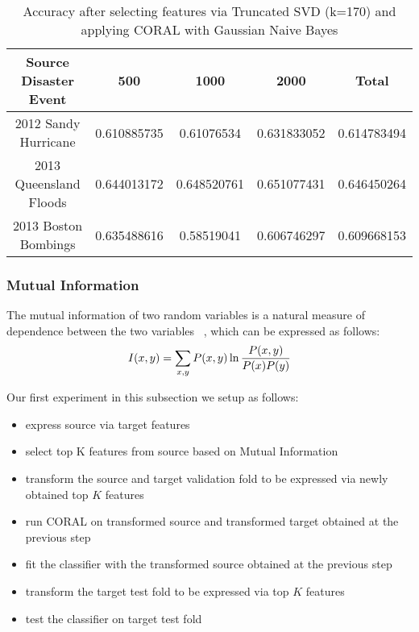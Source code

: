 \begin{table}[!h]%
    \begin{center}
    \caption{Accuracy after selecting features via Truncated SVD (k=170) and applying CORAL with Gaussian Naive Bayes}
    \begin{tabular}[c]{|c|c|c|c|c|}
        \hline
        Source Disaster Event & 500 & 1000 & 2000 & Total \\
        \hline
        2012 Sandy Hurricane & 0.610885735 & 0.61076534 & 0.631833052 & 0.614783494 \\
        2013 Queensland Floods & 0.644013172 & 0.648520761 & 0.651077431 & 0.646450264 \\
        2013 Boston Bombings & 0.635488616 & 0.58519041 & 0.606746297 & 0.609668153 \\
        \hline
    \end{tabular}
    \label{tabletrunsvd170}
   \end{center}
\end{table}


\subsubsection{Mutual Information}

The mutual information of two random variables is a natural measure of dependence between the two variables ~\citep{hastie}, which can be expressed as follows: \[I(x,y) = \sum_{x,y} P(x,y) \ln {{P(x,y)}\over{P(x) P(y)}} \]

Our first experiment in this subsection we setup as follows:
  \begin{itemize}
  \item express source via target features
  \item select top K features from source based on Mutual Information
  \item transform the source and target validation fold to be expressed via newly obtained top $K$ features 
  \item run CORAL on transformed source and transformed target obtained at the previous step
  \item fit the classifier with the transformed source obtained at the previous step
  \item transform the target test fold to be expressed via top $K$ features
  \item test the classifier on target test fold
  \end{itemize}

